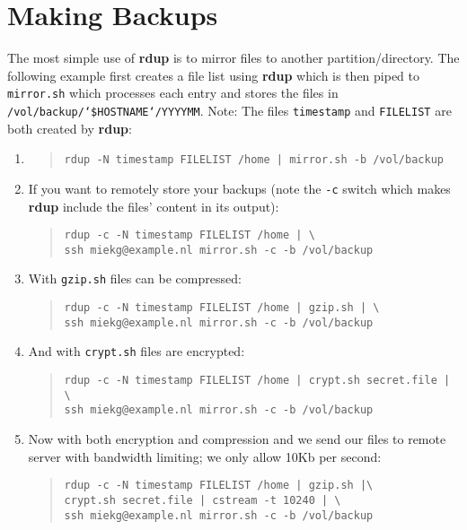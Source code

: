 \documentclass[a4paper, openany]{memoir}
\newcommand{\rdup}{\textbf{rdup}}
\newcommand{\cmd}[1]{\texttt{#1}}
\begin{document}
\chapter{Making Backups}
The most simple use of \rdup{} is to mirror files to
another partition/directory. The following example first
creates a file list using \rdup{} which is then piped to 
\cmd{mirror.sh} which processes each entry and stores the
files in 
\texttt{/vol/backup/`\$HOSTNAME`/YYYYMM}.
Note: The files \cmd{timestamp} and \cmd{FILELIST} are
both created by \rdup:
\begin{enumerate}
\item
\begin{quote}
\begin{verbatim}
rdup -N timestamp FILELIST /home | mirror.sh -b /vol/backup
\end{verbatim}
\end{quote}

\item
If you want to remotely store your backups (note the \cmd{-c} switch which makes
\rdup{} include the files' content in its output):
\begin{quote}
\begin{verbatim}
rdup -c -N timestamp FILELIST /home | \
ssh miekg@example.nl mirror.sh -c -b /vol/backup
\end{verbatim}
\end{quote}

\item
With \cmd{gzip.sh} files can be compressed:
\begin{quote}
\begin{verbatim}
rdup -c -N timestamp FILELIST /home | gzip.sh | \
ssh miekg@example.nl mirror.sh -c -b /vol/backup
\end{verbatim}
\end{quote}

\item
And with \cmd{crypt.sh} files are encrypted:
\begin{quote}
\begin{verbatim}
rdup -c -N timestamp FILELIST /home | crypt.sh secret.file | \
ssh miekg@example.nl mirror.sh -c -b /vol/backup
\end{verbatim}
\end{quote}

\item
Now with both encryption and compression and we 
send our files to remote server with bandwidth limiting; we
only allow 10Kb per second:
\begin{quote}
\begin{verbatim}
rdup -c -N timestamp FILELIST /home | gzip.sh |\
crypt.sh secret.file | cstream -t 10240 | \
ssh miekg@example.nl mirror.sh -c -b /vol/backup
\end{verbatim}
\end{quote}

\end{enumerate}
\end{document}
